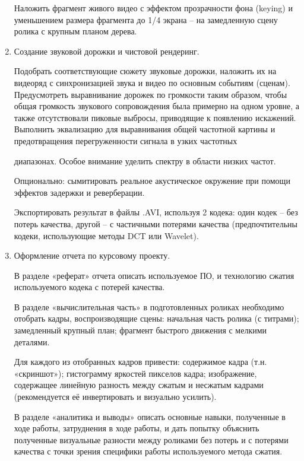\begin{enumerate}
Наложить фрагмент живого видео с эффектом прозрачности фона (keying) и уменьшением размера фрагмента до 1/4 экрана – на замедленную сцену ролика с крупным планом дерева.

\item Создание звуковой дорожки и чистовой рендеринг.

Подобрать соответствующие сюжету звуковые дорожки, наложить их на видеоряд с синхронизацией звука и видео по основным событиям (сценам). Предусмотреть выравнивание дорожек по громкости таким образом, чтобы общая громкость звукового сопровождения была примерно на одном уровне, а также отсутствовали пиковые выбросы, приводящие к появлению искажений. Выполнить эквализацию для выравнивания общей частотной картины и предотвращения перегруженности сигнала в узких частотных

диапазонах. Особое внимание уделить спектру в области низких частот.

Опционально: сымитировать реальное акустическое окружение при помощи эффектов задержки и реверберации.

Экспортировать результат в файлы .AVI, используя 2 кодека: один кодек – без потерь качества, другой – с частичными потерями качества (предпочтительны кодеки, использующие методы DCT или Wavelet).

\item Оформление отчета по курсовому проекту.

В разделе «реферат» отчета описать используемое ПО, и технологию сжатия используемого кодека с потерей качества.

В разделе «вычислительная часть» в подготовленных роликах необходимо отобрать кадры, воспроизводящие сцены: начальная часть ролика (с титрами); замедленный крупный план; фрагмент быстрого движения с мелкими деталями.

Для каждого из отобранных кадров привести: содержимое кадра (т.н. «скриншот»); гистограмму яркостей пикселов кадра; изображение, содержащее линейную разность между сжатым и несжатым кадрами (рекомендуется её инвертировать и визуально усилить).

В разделе «аналитика и выводы» описать основные навыки, полученные в ходе работы, затруднения в ходе работы, и дать попытку объяснить полученные визуальные разности между роликами без потерь и с потерями качества с точки зрения специфики работы используемого метода сжатия.

\end{enumerate}


\pagebreak